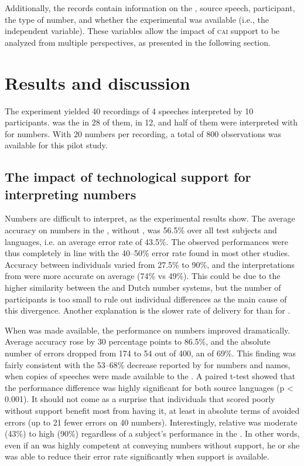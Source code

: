 \documentclass[output=paper]{langsci/langscibook}
\begin{document}
Additionally, the records contain information on the , source speech, participant, the type of number, and whether the experimental  was available (i.e., the independent variable). These variables allow the impact of \textsc{cai} support to be analyzed from multiple perspectives, as presented in the following section.

\section{Results and discussion}\largerpage
The experiment yielded 40 recordings of 4 speeches interpreted by 10 participants.  was the  in 28 of them,  in 12, and half of them were interpreted with  for numbers. With 20 numbers per recording, a total of 800 observations was available for this pilot study.

\subsection{The impact of technological support for interpreting numbers}
Numbers are difficult to interpret, as the experimental results show. The average accuracy on numbers in the , without , was 56.5\% over all test subjects and languages, i.e. an average error rate of 43.5\%. The observed performances were thus completely in line with the 40--50\% error rate found in most other studies. Accuracy between individuals varied from 27.5\% to 90\%, and the interpretations from  were more accurate on average (74\% vs 49\%). This could be due to the higher similarity between the  and Dutch number systems, but the number of participants is too small to rule out individual differences as the main cause of this divergence. Another explanation is the slower rate of delivery for  than for .

When  was made available, the performance on numbers improved dramatically. Average accuracy rose by 30 percentage points to 86.5\%, and the absolute number of errors dropped from 174 to 54 out of 400, an  of 69\%. This finding was fairly consistent with the 53--68\% decrease reported by \citet{Lamberger-Felber2001} for numbers and names, when copies of speeches were made available to the . A paired t-test showed that the performance difference was highly significant for both source languages (p < 0.001). It should not come as a surprise that individuals that scored poorly without support benefit most from having it, at least in absolute terms of avoided errors (up to 21 fewer errors on 40 numbers). Interestingly, relative  was moderate (43\%) to high (90\%) regardless of a subject’s performance in the . In other words, even if an  was highly competent at conveying numbers without support, he or she was able to reduce their error rate significantly when support is available.
\end{document}
